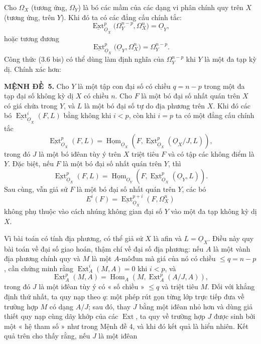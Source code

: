 \documentclass[11pt,twoside,openany]{book}
\numberwithin{equation}{section}
\newcommand{\src}[1]{%
  \phantomsection\hypertarget{src:\fgasourceid:#1}{}%
  \marginpar{\raggedleft\footnotesize\sffamily #1}%
}
\newcommand{\fgasourceid}{unset}
\newcommand{\Osh}{\underline{O}}
\newcommand{\Homsh}{\underline{\operatorname{Hom}}}
\newcommand{\Extsh}{\underline{\operatorname{Ext}}}
\newcommand{\result}[2]{\par\medskip\noindent\textbf{#1\if\relax\detokenize{#2}\relax\else\ #2\fi.}\quad}
\begin{document}
\src{176}
Cho $\Omega_X$ (tương ứng, $\Omega_Y$) là bó các mầm của các dạng
vi phân chính quy trên $X$ (tương ứng, trên $Y$). Khi đó ta có các đẳng cấu
chính tắc:
\begin{equation}\tag{3.6}
  \Extsh_{\Osh_X}^{p}\bigl(\Omega_Y^{n-p},\Omega_X^{n}\bigr)=\Osh_Y,
\end{equation}
hoặc tương đương
\begin{equation}\tag{3.6 bis}
  \Extsh_{\Osh_X}^{p}\bigl(\Osh_Y,\Omega_X^{n}\bigr)=\Omega_Y^{n-p}.
\end{equation}
Công thức (3.6 bis) có thể dùng làm định nghĩa của $\Omega_Y^{n-p}$ khi $Y$
là một đa tạp kỳ dị. Chính xác hơn:

\result{MỆNH ĐỀ}{5} Cho $Y$ là một tập con đại số có chiều
$q=n-p$ trong một đa tạp đại số không kỳ dị $X$ có chiều $n$. Cho
$F$ là một bó đại số nhất quán trên $X$ có giá chứa trong $Y$, và $L$
là một bó đại số tự do địa phương trên $X$. Khi đó các bó
$\Extsh_{\Osh_X}^{i}(F,L)$ bằng không khi $i<p$, còn khi $i=p$ ta có một
đẳng cấu chính tắc
\begin{equation}\tag{3.7}
  \Extsh_{\Osh_X}^{p}(F,L)
  =\Homsh_{\Osh_X}\!\left(F,
  \Extsh_{\Osh_X}^{p}(\Osh_X/J,L)\right),
\end{equation}
trong đó $J$ là một bó iđêan tùy ý trên $X$ triệt tiêu $F$ và có
tập các không điểm là $Y$. Đặc biệt, nếu $F$ là một bó đại số
nhất quán trên $Y$, thì
\begin{equation}\tag{3.7 bis}
  \Extsh_{\Osh_X}^{p}(F,L)
  =\Homsh_{\Osh_Y}\!\left(F,\Extsh_{\Osh_X}^{p}(\Osh_Y,L)\right).
\end{equation}
Sau cùng, vẫn giả sử $F$ là một bó đại số nhất quán trên $Y$, các bó
\[
  E^{i}(F)=\Extsh_{\Osh_X}^{p+i}(F,\Omega_X^{n})
\]
không phụ thuộc vào cách nhúng không gian đại số $Y$ vào một đa tạp
không kỳ dị $X$.

Vì bài toán có tính địa phương, có thể giả sử $X$ là afin và $L=\Osh_X$. Điều này quy
bài toán về đại số giao hoán, thậm chí về đại số địa phương: nếu $A$ là một
vành địa phương chính quy và $M$ là một $A$-môđun mà giá của nó có chiều
$\leq q=n-p$, cần chứng minh rằng $\operatorname{Ext}_{A}^{i}(M,A)=0$ khi $i<p$, và
\[
  \operatorname{Ext}_{A}^{p}(M,A)
  =\operatorname{Hom}_{A}\!\left(M,\operatorname{Ext}_{A}^{p}(A/J,A)\right),
\]
trong đó $J$ là một iđêan tùy ý có « số chiều » $\leq q$ và triệt tiêu $M$. Đối với
khẳng định thứ nhất, ta quy nạp theo $q$: một phép rút gọn từng lớp trực tiếp đưa
về trường hợp $M$ có dạng $A/J$; sau đó, thay $J$ bằng một iđêan nhỏ hơn
và dùng giả thiết quy nạp cùng dãy khớp của các
$\operatorname{Ext}$, ta quy về trường hợp $J$ được sinh bởi một « hệ tham số »
như trong Mệnh đề 4, và khi đó kết quả là hiển nhiên. Kết quả
trên cho thấy rằng, nếu $J$ là một iđêan
\end{document}

